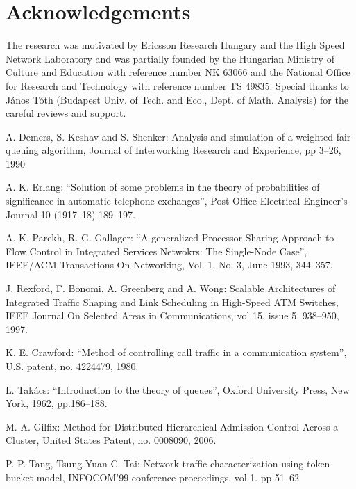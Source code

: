 \documentclass[conference]{IEEEtran}
\newcommand{\comment}[1]{}
\begin{document}
\section{Acknowledgements}
The research was motivated by Ericsson Research Hungary and the High
Speed Network Laboratory and was partially founded by the Hungarian
Ministry of Culture and Education with reference number NK 63066 and
the National Office for Research and Technology with reference
number TS 49835\comment{Fritz Jozsef fele OTKA szam}. Special thanks
to J\'anos T\'oth (Budapest Univ. of Tech. and Eco., Dept. of Math.
Analysis) for the careful reviews and support.

\begin{thebibliography}{1}
 A. Demers, S. Keshav and S. Shenker: Analysis and simulation of a
weighted fair queuing algorithm, Journal of Interworking Research
and Experience, pp 3--26, 1990

A. K. Erlang: ``Solution of some problems in the
theory of probabilities of significance in automatic telephone
exchanges'', Post Office Electrical Engineer's Journal 10 (1917--18)
189--197.

A\comment{bhay}. K. Parekh, R\comment{obert}. G. Gallager: ``A generalized Processor
Sharing Approach to Flow Control in Integrated Services Netwokrs:
The Single-Node Case'', IEEE/ACM Transactions On Networking, Vol. 1,
No. 3, June 1993, 344--357.

 J\comment{ennifer}. Rexford, F\comment{lavio}. Bonomi, A\comment{lbert}. Greenberg and
A\comment{lbert}. Wong: Scalable Architectures of Integrated Traffic
Shaping and Link Scheduling in High-Speed ATM Switches, IEEE Journal
On Selected Areas in Communications, vol 15, issue 5, 938--950,
1997.

K\comment{enneth}. E. Crawford: ``Method of controlling call
traffic in a communication system'', U.S. patent, no. 4224479, 1980.

L\comment{ajos}. Tak\'acs: ``Introduction to the theory of
queues'', Oxford University Press, New York, 1962, pp.186--188.

M\comment{ichael}. A. Gilfix: Method for Distributed Hierarchical Admission
Control Across a Cluster, United States Patent, no. 0008090, 2006.

P\comment{uqi}. P\comment{erry}. Tang, Tsung-Yuan C\comment{harles}. Tai: Network traffic
characterization using token bucket model, INFOCOM'99 conference
proceedings, vol 1. pp 51--62\comment{Optimization of the token
bucket mechanism for given traffic.}


\end{thebibliography}
\end{document}

